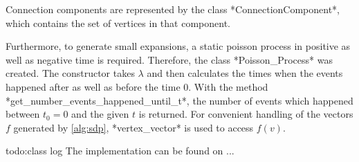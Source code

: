Connection components are represented by the class *ConnectionComponent*, which contains the set of vertices in that component.

Furthermore, to generate small expansions, a static poisson process in positive as well as negative time is required. Therefore, the class *Poisson\_Process* was created. The constructor takes $\lambda$ and then calculates the times when the events happened after as well as before the time 0. With the method *get\_number\_events\_happened\_until\_t*, the number of events which happened between $t_0=0$ and the given $t$ is returned. 
For convenient handling of the vectors $f$ generated by \cref{alg:sdp}, *vertex\_vector* is used to access $f(v)$.

todo:class log
The implementation can be found on ... %
